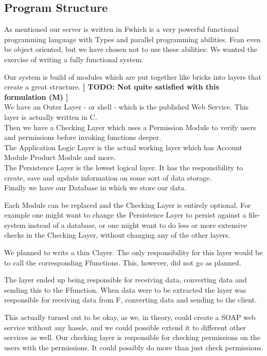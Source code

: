 \subsection{Program Structure}
As mentioned our server is written in F\Sh which is a very powerful functional programming language with Types and parallel programming abilities. F\Sh can even be object oriented, but we have chosen not to use these abilities: We wanted the exercise of writing a fully functional system.

Our system is build of modules which are put together like bricks into layers that create a great structure. \textbf{[ TODO: Not quite satisfied with this formulation (M) ]}
\\We have an Outer Layer - or shell - which is the published Web Service. This layer is actually written in C\Sh.
\\Then we have a Checking Layer which uses a Permission Module to verify users and permissions before invoking functions deeper.
\\The Application Logic Layer is the actual working layer which has Account Module Product Module and more.
\\The Persistence Layer is the lowest logical layer. It has the responsibility to create, save and update information on some sort of data storage.
\\Finally we have our Database in which we store our data.

Each Module can be replaced and the Checking Layer is entirely optional. For example one might want to change the Persistence Layer to persist against a file-system instead of a database, or one might want to do less or more extensive checks in the Checking Layer, without changing any of the other layers.

We planned to write a thin C\Sh layer. The only responsibility for this layer would be to call the corresponding F\Sh functions. This, however, did not go as planned.

The layer ended up being responsible for receiving data, converting data and sending this to the F\Sh function. When data were to be extracted the layer was responsible for receiving data from F\Sh, converting data and sending to the client.

This actually turned out to be okay, as we, in theory, could create a SOAP web service without any hassle, and we could possible extend it to different other services as well.
Our checking layer is responsible for checking permissions on the users with the permissions. It could possibly do more than just check permissions.

